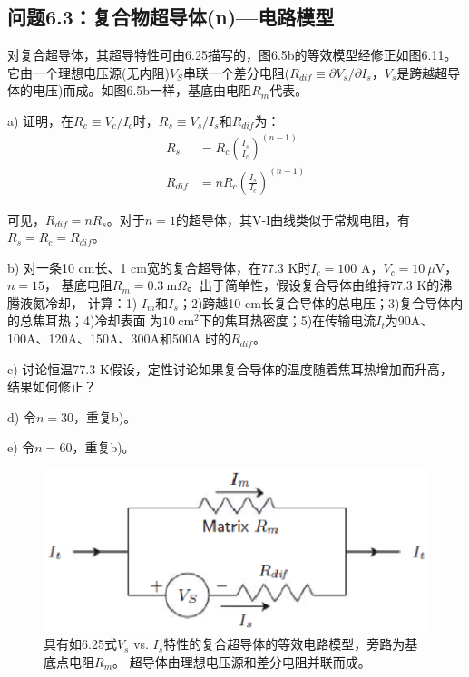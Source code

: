 \subsection{问题6.3：复合物超导体(n)---电路模型}
对复合超导体，其超导特性可由6.25描写的，图6.5b的等效模型经修正如图6.11。
它由一个理想电压源(无内阻)$V_S$串联一个差分电阻($R_{dif}\equiv \partial V_s/\partial I_s$，$V_s$是跨越超导体的电压)而成。如图6.5b一样，基底由电阻$R_m$代表。

a) 证明，在$R_c\equiv V_c/I_c$时，$R_s\equiv V_s/I_s$和$R_{dif}$为：
\begin{subequations}
	\begin{align}
	R_s&=R_c(\frac{I_s}{I_c})^{(n-1)}\\
	R_{dif}&=nR_c(\frac{I_s}{I_c})^{(n-1)}
	\end{align}
\end{subequations}

可见，$R_{dif}=nR_s$。对于$n=1$的超导体，其V-I曲线类似于常规电阻，有$R_s=R_c=R_{dif}$。

b) 对一条10 cm长、1 cm宽的复合超导体，在77.3 K时$I_c=100$ A，$V_c=10\ \mu$V，$n=15$，
基底电阻$R_m=0.3\ \mathrm{m}\Omega$。出于简单性，假设复合导体由维持77.3 K的沸腾液氮冷却， 
计算：1) $I_m$和$I_s$；2)跨越10 cm长复合导体的总电压；3)复合导体内的总焦耳热；4)冷却表面
为$10\ \mathrm{cm^2}$下的焦耳热密度；5)在传输电流$I_t$为90A、100A、120A、150A、300A和500A
时的$R_{dif}$。

c) 讨论恒温77.3 K假设，定性讨论如果复合导体的温度随着焦耳热增加而升高，结果如何修正？

d) 令$n=30$，重复b)。

e) 令$n=60$，重复b)。
\begin{figure}[htbp]
	\centering
	\includegraphics[scale=0.7]{chpt6/figs/fig6.11.eps}
	\caption{具有如6.25式$V_s$ vs. $I_s$特性的复合超导体的等效电路模型，旁路为基底点电阻$R_m$。
	超导体由理想电压源和差分电阻并联而成。}
\end{figure}


